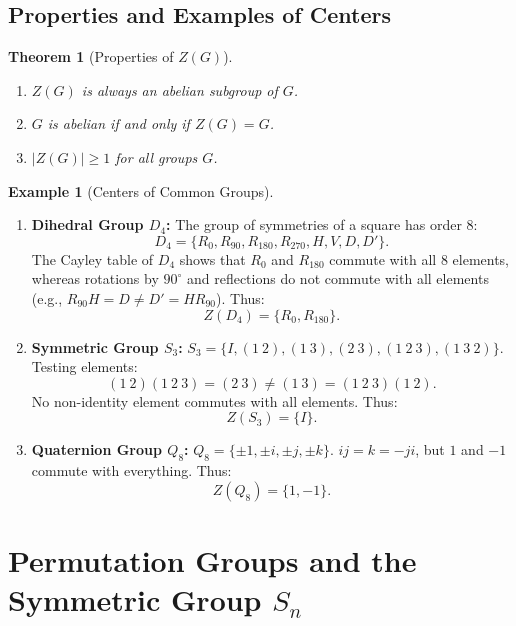 \documentclass[12pt]{article}
\theoremstyle{definition}
\newtheorem{example}[definition]{Example}
\theoremstyle{plain}
\newtheorem{theorem}{Theorem}[section]
\begin{document}
\subsection{Properties and Examples of Centers}

\begin{theorem}[Properties of $Z(G)$]
\begin{enumerate}
    \item $Z(G)$ is always an abelian subgroup of $G$.
    \item $G$ is abelian if and only if $Z(G) = G$.
    \item $|Z(G)| \ge 1$ for all groups $G$.
\end{enumerate}
\end{theorem}

\begin{example}[Centers of Common Groups]
\begin{enumerate}
    \item \textbf{Dihedral Group $D_4$:}
    The group of symmetries of a square has order 8:
    \[
    D_4 = \{R_0, R_{90}, R_{180}, R_{270}, H, V, D, D'\}.
    \]
    The Cayley table of $D_4$ shows that $R_0$ and $R_{180}$ commute with all 8 elements, whereas rotations by $90^\circ$ and reflections do not commute with all elements (e.g., $R_{90} H = D \neq D' = H R_{90}$).
    Thus:
    \[
    Z(D_4) = \{R_0, R_{180}\}.
    \]

    \item \textbf{Symmetric Group $S_3$:}
    $S_3 = \{I, (1\ 2), (1\ 3), (2\ 3), (1\ 2\ 3), (1\ 3\ 2)\}$.
    Testing elements:
    \[
    (1\ 2)(1\ 2\ 3) = (2\ 3) \neq (1\ 3) = (1\ 2\ 3)(1\ 2).
    \]
    No non-identity element commutes with all elements. Thus:
    \[
    Z(S_3) = \{I\}.
    \]

    \item \textbf{Quaternion Group $Q_8$:}
    $Q_8 = \{\pm 1, \pm i, \pm j, \pm k\}$.
    $ij = k = -ji$, but $1$ and $-1$ commute with everything. Thus:
    \[
    Z(Q_8) = \{1, -1\}.
    \]
\end{enumerate}
\end{example}

\section{Permutation Groups and the Symmetric Group \texorpdfstring{$S_n$}{Sn}}
\end{document}
